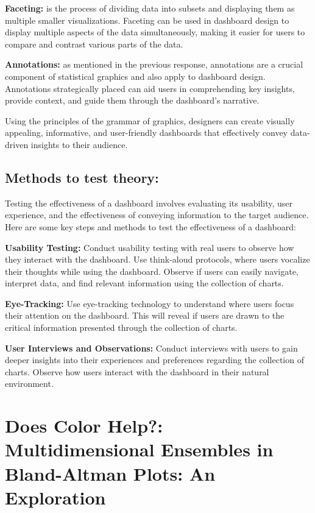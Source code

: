 \documentclass[print]{nuthesis}
\begin{document}
\textbf{Faceting:} is the process of dividing data into subsets and displaying them as multiple smaller visualizations.
Faceting can be used in dashboard design to display multiple aspects of the data simultaneously, making it easier for users to compare and contrast various parts of the data.

\textbf{Annotations:} as mentioned in the previous response, annotations are a crucial component of statistical graphics and also apply to dashboard design.
Annotations strategically placed can aid users in comprehending key insights, provide context, and guide them through the dashboard's narrative.

Using the principles of the grammar of graphics, designers can create visually appealing, informative, and user-friendly dashboards that effectively convey data-driven insights to their audience.

\hypertarget{methods-to-test-theory}{%
\section{Methods to test theory:}\label{methods-to-test-theory}}

Testing the effectiveness of a dashboard involves evaluating its usability, user experience, and the effectiveness of conveying information to the target audience.
Here are some key steps and methods to test the effectiveness of a dashboard:

\textbf{Usability Testing:}
Conduct usability testing with real users to observe how they interact with the dashboard.
Use think-aloud protocols, where users vocalize their thoughts while using the dashboard.
Observe if users can easily navigate, interpret data, and find relevant information using the collection of charts.

\textbf{Eye-Tracking:}
Use eye-tracking technology to understand where users focus their attention on the dashboard.
This will reveal if users are drawn to the critical information presented through the collection of charts.

\textbf{User Interviews and Observations:}
Conduct interviews with users to gain deeper insights into their experiences and preferences regarding the collection of charts.
Observe how users interact with the dashboard in their natural environment.

\hypertarget{ref-labels}{%
\chapter{Does Color Help?: Multidimensional Ensembles in Bland-Altman Plots: An Exploration}\label{ref-labels}}
\end{document}
